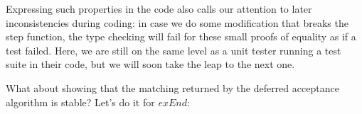 {Expressing such properties in the code also calls our attention to later inconsistencies during coding: in case we do some modification that breaks the step function, the type checking will fail for these small proofs of equality as if a test failed. Here, we are still on the same level as a unit tester running a test suite in their code, but we will soon take the leap to the next one.

What about showing that the matching returned by the deferred acceptance algorithm is stable? Let's do it for $exEnd$:

\begin{code}%
\>[0]\<%
\\
\>[0]\AgdaSpace{}%
\AgdaSymbol{:}\AgdaSpace{}%
\AgdaSymbol{(}\AgdaSpace{}%
\AgdaSpace{}%
\AgdaSymbol{:}\AgdaSpace{}%
\AgdaSpace{}%
\AgdaSpace{}%
\AgdaSymbol{)}%
\>[39]\<%
\\
\>[0][@{}l@{\AgdaIndent{0}}]%
\>[6]\<%
\\
%
\>[6]\AgdaSpace{}%
\AgdaSpace{}%
\AgdaSpace{}%
\AgdaSpace{}%
\<%
\\
%
\>[6]\AgdaSpace{}%
\AgdaSpace{}%
\AgdaSpace{}%
\AgdaSpace{}%
\<%
\\
%
\>[6]\<%
\\
%
\>[6]\AgdaSpace{}%
\AgdaSymbol{(}\AgdaSpace{}%
\AgdaSpace{}%
\AgdaSymbol{)}\AgdaSpace{}%
\<%
\\
%
\>[6]\<%
\\
\>[6][@{}l@{\AgdaIndent{0}}]%
\>[7]\<%
\\
%
\>[6]\AgdaSymbol{(((}\AgdaSpace{}%
\AgdaSymbol{)}\AgdaSpace{}%
\AgdaOperator{\AgdaInductiveConstructor{,}}\<%
\\
%
\>[6]\AgdaSymbol{(}\AgdaSpace{}%
\AgdaSymbol{(}\AgdaSpace{}%
\AgdaSymbol{)}\AgdaSpace{}%

\end{code}}
